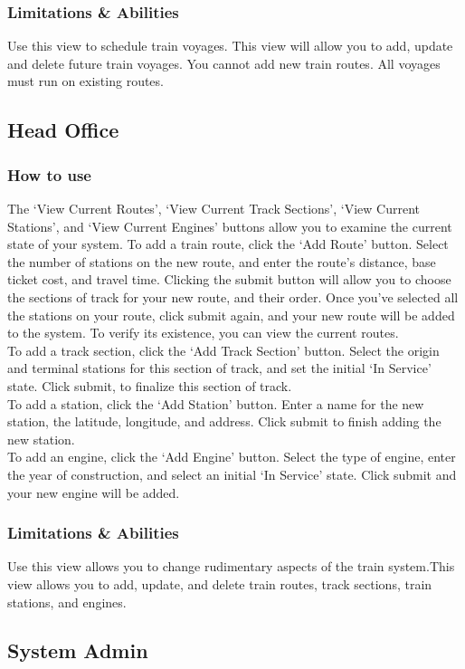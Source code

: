 \documentclass[letter]{article}
\begin{document}
\subsubsection{Limitations \& Abilities}
Use this view to schedule train voyages. This view will allow you to add, update and delete future train voyages. You cannot add new train routes. All voyages must run on existing routes.


\subsection{Head Office}
\subsubsection{How to use}
The `View Current Routes', `View Current Track Sections', `View Current Stations', and `View Current Engines' buttons allow you to examine the current state of your system.
To add a train route, click the `Add Route' button. Select the number of stations on the new route, and enter the route's distance, base ticket cost, and travel time. Clicking the submit button will allow you to choose the sections of track for your new route, and their order. Once you've selected all the stations on your route, click submit again, and your new route will be added to the system. To verify its existence, you can view the current routes.\\
To add a track section, click the `Add Track Section' button. Select the origin and terminal stations for this section of track, and set the initial `In Service' state. Click submit, to finalize this section of track. \\
To add a station, click the `Add Station' button. Enter a name for the new station, the latitude, longitude, and address. Click submit to finish adding the new station. \\
To add an engine, click the `Add Engine' button. Select the type of engine, enter the year of construction, and select an initial `In Service' state. Click submit and your new engine will be added.
\subsubsection{Limitations \& Abilities}
Use this view allows you to change rudimentary aspects of the train system.This view allows you to add, update, and delete train routes, track sections, train stations, and engines.

\subsection{System Admin}
\end{document}
